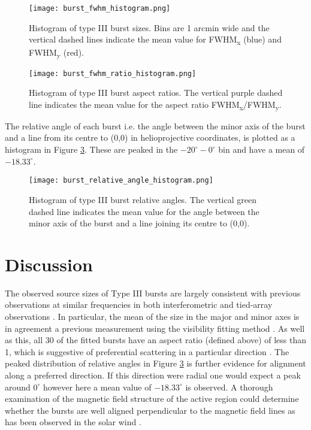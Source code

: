 \begin{figure}[ht]
\centering
\texttt{[image: burst\_fwhm\_histogram.png]}
\caption[Histogram of type III burst sizes.]{Histogram of type III burst sizes. Bins are 1 arcmin wide and the vertical dashed lines indicate the mean value for FWHM\textsubscript{x} (blue) and FWHM\textsubscript{y} (red).}
\label{fig:fwhm_hist}
\end{figure}

\begin{figure}[ht]
\centering
\texttt{[image: burst\_fwhm\_ratio\_histogram.png]}
\caption[Histogram of type III burst aspect ratios.]{Histogram of type III burst aspect ratios. The vertical purple dashed line indicates the mean value for the aspect ratio FWHM\textsubscript{x}/FWHM\textsubscript{y}.}
\label{fig:fwhm_ratio_hist}
\end{figure}

The relative angle of each burst i.e. the angle between the minor axis of the burst and a line from its centre to (0,0) in helioprojective coordinates, is plotted as a histogram in Figure \ref{fig:rel_ang_hist}. These are peaked in the $-20^\circ - 0^\circ$ bin and have a mean of $-18.33^\circ$.

\begin{figure}[ht]
\centering
\texttt{[image: burst\_relative\_angle\_histogram.png]}
\caption[Histogram of type III burst relative angles.]{Histogram of type III burst relative angles. The vertical green dashed line indicates the mean value for the angle between the minor axis of the burst and a line joining its centre to (0,0).}
\label{fig:rel_ang_hist}
\end{figure}

\section{Discussion}
\label{sec:obsvtheory_discussion}
The observed source sizes of Type III bursts are largely consistent with previous observations at similar frequencies in both interferometric and tied-array observations \citep{Kontar2017, Zhang2020}. In particular, the mean of the size in the major and minor axes is in agreement a previous measurement using the visibility fitting method \citep{Murphy2021}. As well as this, all 30 of the fitted bursts have an aspect ratio (defined above) of less than 1, which is suggestive of preferential scattering in a particular direction \citep{Anantharamaiah1994, Bastian1994}. The peaked distribution of relative angles in Figure \ref{fig:rel_ang_hist} is further evidence for alignment along a preferred direction. If this direction were radial one would expect a peak around $0^\circ$ however here a mean value of $-18.33^\circ$ is observed. A thorough examination of the magnetic field structure of the active region could determine whether the bursts are well aligned perpendicular to the magnetic field lines as has been observed in the solar wind \citep{Anantharamaiah1994, SasikumarRaja2016}.

